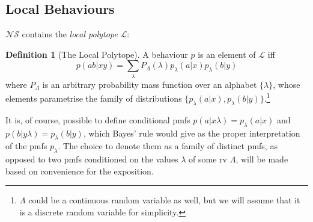 \documentclass[10pt, a4paper]{article}
\numberwithin{equation}{section} %
\newcounter{stmt} %
\theoremstyle{definition}
\newtheorem{defn}[stmt]{Definition}
\theoremstyle{plain}
\newcommand{\?}{\mathrel{?}} %
\newcommand{\Ls}{\mathcal{L}}
\newcommand{\NSs}{\mathcal{NS}}
\begin{document}
    \subsection{Local Behaviours}

    \(\NSs\) contains the \emph{local polytope} \(\Ls\):
    \begin{defn}[The Local Polytope]
      A behaviour \(p\) is an element of \(\Ls\) iff
      \begin{equation}\label{eqn:localdef}
        p(ab|xy) = \sum_{\lambda} P_{\Lambda}({\lambda}) p_{{\lambda}}(a|x)p_{{\lambda}}(b|y)
      \end{equation}
      where \(P_{\Lambda}\) is an arbitrary probability mass function over an alphabet \(\{\lambda\}\), whose elements parametrise the family of distributions \(\{p_{\lambda}(a|x), p_{\lambda}(b|y)\}\).\footnote{\(\Lambda\) could be a continuous random variable as well, but we will assume that it is a discrete random variable for simplicity.}
    \end{defn}
    It is, of course, possible to define conditional pmfs \(p(a|x\lambda) = p_{\lambda}(a|x)\) and \(p(b|y\lambda) = p_{\lambda}(b|y)\), which Bayes' rule would give as the proper interpretation of the pmfs \(p_{\lambda}\). The choice to denote them as a family of distinct pmfs, as opposed to two pmfs conditioned on the values \(\lambda\) of some rv \(\Lambda\), will be made based on convenience for the exposition.
\end{document}
